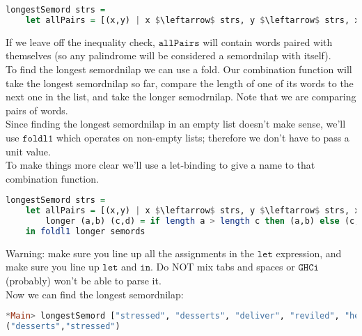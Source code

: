 \documentclass[a4paper,12pt]{article}
\newcommand{\kwa}[1]{\mathtt{#1}}
\begin{document}
\begin{lstlisting}[language=Haskell]
longestSemord strs =
	let allPairs = [(x,y) | x $\leftarrow$ strs, y $\leftarrow$ strs, x /= y, reverse x == y]
\end{lstlisting}

\noindent
If we leave off the inequality check, $\kwa{allPairs}$ will contain words paired with themselves (so any palindrome will be considered a semordnilap with itself). \\

\noindent
To find the longest semordnilap we can use a fold. Our combination function will take the longest semordnilap so far, compare the length of one of its words to the next one in the list, and take the longer semodrnilap. Note that we are comparing pairs of words. \\

\noindent
Since finding the longest semordnilap in an empty list doesn't make sense, we'll use $\kwa{foldl1}$ which operates on non-empty lists; therefore we don't have to pass a unit value. \\

\noindent
To make things more clear we'll use a let-binding to give a name to that combination function.

\begin{lstlisting}[language=Haskell]
longestSemord strs =
	let allPairs = [(x,y) | x $\leftarrow$ strs, y $\leftarrow$ strs, x /= y, reverse x == y]
        longer (a,b) (c,d) = if length a > length c then (a,b) else (c,d)
    in foldl1 longer semords
\end{lstlisting}

\noindent
Warning: make sure you line up all the assignments in the $\kwa{let}$ expression, and make sure you line up $\kwa{let}$ and $\kwa{in}$. Do NOT mix tabs and spaces or $\kwa{GHCi}$ (probably) won't be able to parse it. \\

\noindent
Now we can find the longest semordnilap:

\begin{lstlisting}[language=Haskell]
*Main> longestSemord ["stressed", "desserts", "deliver", "reviled", "hello"]
("desserts","stressed")
\end{lstlisting}
\end{document}
